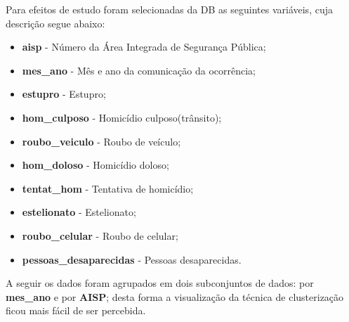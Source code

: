 \documentclass[a4paper, 12pt]{article}\usepackage[]{graphicx}\usepackage[]{color}
\begin{document}
	\begin{multicols}{2}
		  Para efeitos de estudo foram selecionadas da DB as seguintes variáveis, cuja descrição segue abaixo:
		 	\begin{itemize}
		 		\item \textbf{aisp} - Número da Área Integrada de Segurança Pública;
		 		\item \textbf{mes\_ano} - Mês e ano da comunicação da ocorrência;
		 		\item \textbf{estupro} - Estupro;
		 		\item \textbf{hom\_culposo} - Homicídio culposo(trânsito);
		 		\item \textbf{roubo\_veiculo} - Roubo de veículo;
		 		\item \textbf{hom\_doloso} - Homicídio doloso;
		 		\item \textbf{tentat\_hom} - Tentativa de homicídio;
		 		\item \textbf{estelionato} - Estelionato;
		 		\item \textbf{roubo\_celular} - Roubo de celular;
		 		\item \textbf{pessoas\_desaparecidas} - Pessoas desaparecidas.
		 	\end{itemize}
	 	A seguir os dados foram agrupados em dois subconjuntos de dados:  por \textbf{mes\_ano} e por \textbf{AISP};  desta forma a visualização da técnica de clusterização ficou mais fácil de ser percebida. \\
	 	\end{multicols}
\end{document}
